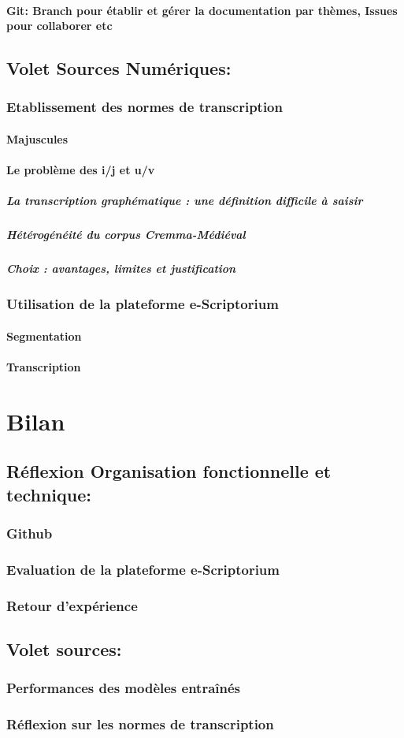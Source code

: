 \documentclass{article}
\begin{document}
      \paragraph{Git: Branch pour établir et gérer la documentation par thèmes, Issues pour collaborer etc}
  \subsection{Volet Sources Numériques:}
    \subsubsection{Etablissement des normes de transcription}
      \paragraph{Majuscules}
      \paragraph{Le problème des i/j et u/v}
        \subparagraph{La transcription graphématique : une définition difficile à saisir}
        \subparagraph{Hétérogénéité du corpus Cremma-Médiéval}
        \subparagraph{Choix : avantages, limites et justification}
    \subsubsection{Utilisation de la plateforme e-Scriptorium}
      \paragraph{Segmentation}
      \paragraph{Transcription}

\section{Bilan}

  \subsection{Réflexion Organisation fonctionnelle et technique:}
    \subsubsection{Github}
    \subsubsection{Evaluation de la plateforme e-Scriptorium}
    \subsubsection{Retour d'expérience}
  \subsection{Volet sources:}
    \subsubsection{Performances des modèles entraînés}
    \subsubsection{Réflexion sur les normes de transcription}

\printbibliography
\end{document}
